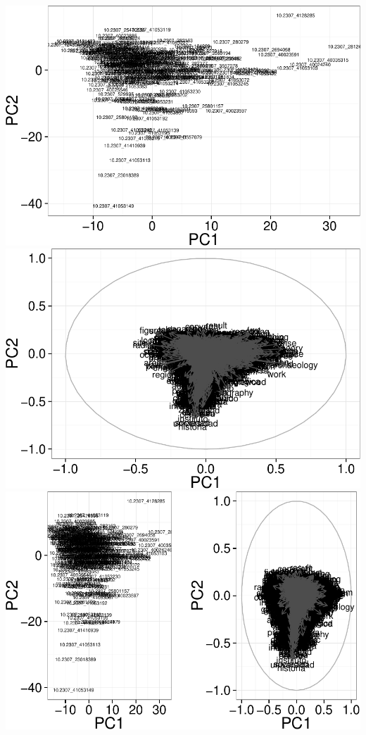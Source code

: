 \documentclass[10pt]{article}
\newenvironment{CodeChunk}{}{}
\begin{document}
\begin{CodeChunk}
\begin{CodeChunk}
\includegraphics{509Assignment_files/figure-latex/onegram3-17} 
\includegraphics{509Assignment_files/figure-latex/onegram3-18} 
\includegraphics{509Assignment_files/figure-latex/onegram3-19} 

\end{CodeChunk}
\end{CodeChunk}
\end{document}
